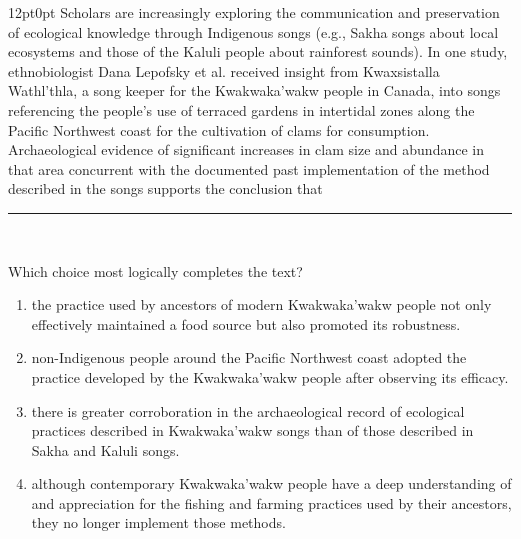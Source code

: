 \documentclass[11pt, twocolumn]{article}
\newcounter{questionnum}
\begin{document}
\vspace{6pt}\noindent
\begin{minipage}{\columnwidth}\raggedright
\noindent{}\par\vspace{8pt}
\begin{adjustwidth}{12pt}{0pt}
Scholars are increasingly exploring the communication and preservation of ecological knowledge through Indigenous songs (e.g., Sakha songs about local ecosystems and those of the Kaluli people about rainforest sounds). In one study, ethnobiologist Dana Lepofsky et al. received insight from Kwaxsistalla Wathl'thla, a song keeper for the Kwakwaka'wakw people in Canada, into songs referencing the people's use of terraced gardens in intertidal zones along the Pacific Northwest coast for the cultivation of clams for consumption. Archaeological evidence of significant increases in clam size and abundance in that area concurrent with the documented past implementation of the method described in the songs supports the conclusion that \,\rule{2cm}{0.4pt}\,
\vspace{6pt}

Which choice most logically completes the text?
\begin{enumerate}[label=\Alph*),leftmargin=18pt,topsep=3pt,itemsep=2pt]
  \item the practice used by ancestors of modern Kwakwaka'wakw people not only effectively maintained a food source but also promoted its robustness.
  \item non-Indigenous people around the Pacific Northwest coast adopted the practice developed by the Kwakwaka'wakw people after observing its efficacy.
  \item there is greater corroboration in the archaeological record of ecological practices described in Kwakwaka'wakw songs than of those described in Sakha and Kaluli songs.
  \item although contemporary Kwakwaka'wakw people have a deep understanding of and appreciation for the fishing and farming practices used by their ancestors, they no longer implement those methods.
\end{enumerate}
\end{adjustwidth}
\end{minipage}\par
\end{document}
